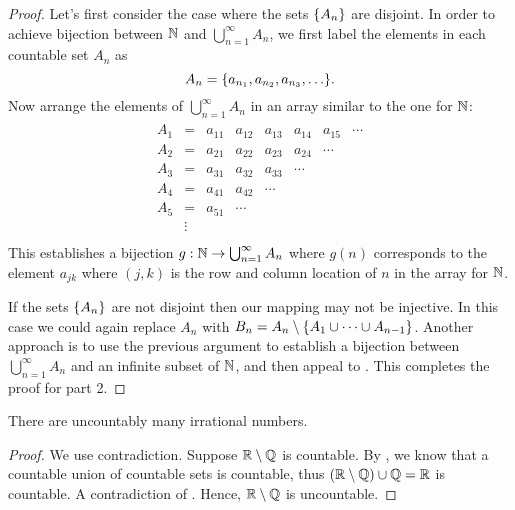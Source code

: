 \begin{proof}
  Let's first consider the case where the sets $\{ A_n \}$ are
  disjoint. In order to achieve bijection between $\mathbb N$ and
  $\bigcup_{n = 1}^{\infty} A_n$, we first label the elements in each
  countable set $A_n$ as
  \[ A_n = \set{a_{n_1}, a_{n_2}, a_{n_3}, \dots}. \]
  Now arrange the elements of $\bigcup_{n = 1}^{\infty} A_n$ in an
  array similar to the one for $\mathbb N$:
  \begin{align*}
    \begin{array}{cccccccc}
      A_1 & =  & a_{11} & a_{12} & a_{13} & a_{14} & a_{15} & \cdots \\
      A_2 & =  & a_{21} & a_{22} & a_{23} & a_{24} & \cdots &        \\
      A_3 & =  & a_{31} & a_{32} & a_{33} & \cdots &        &        \\
      A_4 & =  & a_{41} & a_{42} & \cdots &        &        &        \\
      A_5 & =  & a_{51} & \cdots &        &        &        &        \\
      & \vdots &        &        &        &        &        &        \\
    \end{array}
  \end{align*}
  This establishes a bijection $g : \mathbb N \to \bigcup_{n = 1}^{\infty}
  A_n$ where $g(n)$ corresponds to the element $a_{jk}$ where $(j,
  k)$ is the row and column location of $n$ in the array for $\mathbb N$.

  If the sets $\{ A_n \}$ are not disjoint then our mapping may not
  be injective. In this case we could again replace $A_n$ with $B_n =
  A_n \setminus \{ A_1 \cup \dots \cup A_{n - 1} \}$. Another
  approach is to use the previous argument to establish a bijection
  between $\bigcup_{n = 1}^{\infty} A_n$ and an infinite subset of
  $\mathbb N$, and then appeal to .
  This completes the proof for part 2.
\end{proof}

\begin{theorem}
  There are uncountably many irrational numbers.
\end{theorem}

\begin{proof}
  We use contradiction. Suppose $\mathbb R \setminus \mathbb Q$ is countable. By
  , we know that a countable union
  of countable sets is countable, thus $(\mathbb R \setminus \mathbb Q) \cup \mathbb Q
  = \mathbb R$ is countable. A contradiction of .
  Hence, $\mathbb R \setminus \mathbb Q$ is uncountable.
\end{proof}

